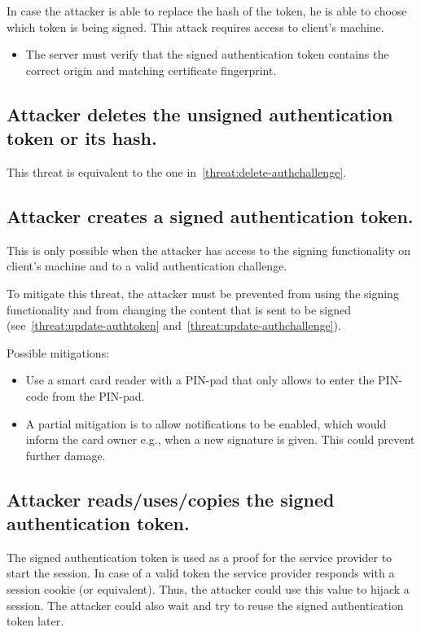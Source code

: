 In case the attacker is able to replace the hash of the token, he is able to choose which token is being signed. This attack requires access to client's machine. 

\begin{itemize}
\item The server must verify that the signed authentication token contains the correct origin and matching certificate fingerprint.
\end{itemize}


\subsection{Attacker deletes the unsigned authentication token or its hash.}
\label{threat:delete-authtoken}
This threat is equivalent to the one in~\ref{threat:delete-authchallenge}.


\subsection{Attacker creates a signed authentication token.}
\label{threat:create-authtoken-signed-hash}
This is only possible when the attacker has access to the signing functionality on client's machine and to a valid authentication challenge. 

To mitigate this threat, the attacker must be prevented from using the signing functionality and from changing the content that is sent to be signed (see~\ref{threat:update-authtoken} and~\ref{threat:update-authchallenge}).

Possible mitigations:
\begin{itemize}
\item Use a smart card reader with a PIN-pad that only allows to enter the PIN-code from the PIN-pad.
\item A partial mitigation is to allow notifications to be enabled, which would inform the card owner e.g., when a new signature is given. This could prevent further damage.
\end{itemize}


\subsection{Attacker reads/uses/copies the signed authentication token.}
\label{threat:read-authtoken-signed-hash}
The signed authentication token is used as a proof for the service provider to start the session. In case of a valid token the service provider responds with a session cookie (or equivalent). Thus, the attacker could use this value to hijack a session. The attacker could also wait and try to reuse the signed authentication token later.

